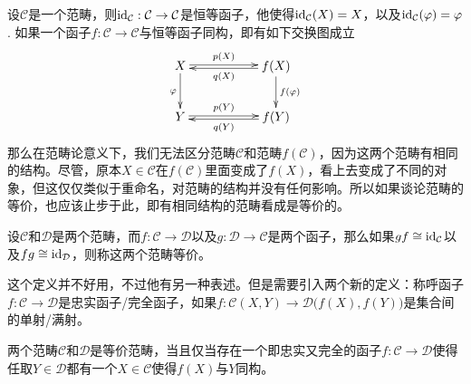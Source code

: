 \para 设$\mathcal{C}$是一个范畴，则$\operatorname{id}_\mathcal{C}:\mathcal{C}\to \mathcal{C}$是恒等函子，他使得$\operatorname{id}_\mathcal{C}(X)=X$，以及$\operatorname{id}_\mathcal{C}(\varphi)=\varphi$. 如果一个函子$f:\mathcal{C}\to\mathcal{C}$与恒等函子同构，即有如下交换图成立
\[
\begin{xy}
	\xymatrix{
		X\ar@<0.3ex>[rr]^-{p(X)} \ar[d]_{\varphi}&&f(X) \ar[d]^{f(\varphi)}\ar@<0.3ex>[ll]^-{q(X)}\\
		Y\ar@<0.3ex>[rr]^-{p(Y)}&&f(Y)\ar@<0.3ex>[ll]^-{q(Y)}
	}
\end{xy}
\]
那么在范畴论意义下，我们无法区分范畴$\mathcal{C}$和范畴$f(\mathcal{C})$，因为这两个范畴有相同的结构。尽管，原本$X\in \mathcal{C}$在$f(\mathcal{C})$里面变成了$f(X)$，看上去变成了不同的对象，但这仅仅类似于重命名，对范畴的结构并没有任何影响。所以如果谈论范畴的等价，也应该止步于此，即有相同结构的范畴看成是等价的。

设$\mathcal{C}$和$\mathcal{D}$是两个范畴，而$f:\mathcal{C}\to \mathcal{D}$以及$g:\mathcal{D}\to \mathcal{C}$是两个函子，那么如果$gf\cong \operatorname{id}_\mathcal{C}$以及$fg\cong \operatorname{id}_\mathcal{D}$，则称这两个范畴等价。

这个定义并不好用，不过他有另一种表述。但是需要引入两个新的定义：称呼函子$f:\mathcal{C}\to \mathcal{D}$是忠实函子/完全函子，如果$f:\mathcal{C}(X,Y)\to \mathcal{D}\bigl(f(X),f(Y)\bigr)$是集合间的单射/满射。

\begin{pro}\label{equivcat}
两个范畴$\mathcal{C}$和$\mathcal{D}$是等价范畴，当且仅当存在一个即忠实又完全的函子$f:\mathcal{C}\to \mathcal{D}$使得任取$Y\in\mathcal{D}$都有一个$X\in \mathcal{C}$使得$f(X)$与$Y$同构。
\end{pro}

